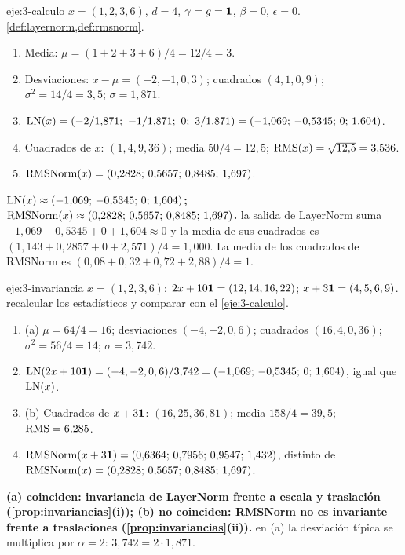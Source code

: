 \begin{solucion}{eje:3-calculo}
\datos $x=(1,2,3,6)$, $d=4$, $\gamma=g=\mathbf{1}$, $\beta=0$, $\epsilon=0$.
\planteamiento \cref{def:layernorm,def:rmsnorm}.
\pasos
\begin{enumerate}[label=\arabic*.]
  \item Media: $\mu=(1+2+3+6)/4=12/4=3$.
  \item Desviaciones: $x-\mu=(-2,-1,0,3)$; cuadrados $(4,1,0,9)$; $\sigma^{2}=14/4=3{,}5$; $\sigma=1{,}871$.
  \item $\LN(x)=(-2/1{,}871;\ -1/1{,}871;\ 0;\ 3/1{,}871)=(-1{,}069;\,-0{,}5345;\,0;\,1{,}604)$.
  \item Cuadrados de $x$: $(1,4,9,36)$; media $50/4=12{,}5$; $\operatorname{RMS}(x)=\sqrt{12{,}5}=3{,}536$.
  \item $\operatorname{RMSNorm}(x)=(0{,}2828;\,0{,}5657;\,0{,}8485;\,1{,}697)$.
\end{enumerate}
\resultado \textbf{$\operatorname{LN}(x)\approx(-1{,}069;\,-0{,}5345;\,0;\,1{,}604)$;}\newline \textbf{$\operatorname{RMSNorm}(x)\approx(0{,}2828;\,0{,}5657;\,0{,}8485;\,1{,}697)$.}
\comprobacion la salida de LayerNorm suma $-1{,}069-0{,}5345+0+1{,}604\approx 0$ y la media de sus cuadrados es $(1{,}143+0{,}2857+0+2{,}571)/4=1{,}000$. La media de los cuadrados de RMSNorm es $(0{,}08+0{,}32+0{,}72+2{,}88)/4=1$.
\end{solucion}

\begin{solucion}{eje:3-invariancia}
\datos $x=(1,2,3,6)$; $2x+10\mathbf{1}=(12,14,16,22)$; $x+3\mathbf{1}=(4,5,6,9)$.
\planteamiento recalcular los estadísticos y comparar con el \cref{eje:3-calculo}.
\pasos
\begin{enumerate}[label=\arabic*.]
  \item (a) $\mu=64/4=16$; desviaciones $(-4,-2,0,6)$; cuadrados $(16,4,0,36)$; $\sigma^{2}=56/4=14$; $\sigma=3{,}742$.
  \item $\operatorname{LN}(2x+10\mathbf{1})=(-4,-2,0,6)/3{,}742=(-1{,}069;\,-0{,}5345;\,0;\,1{,}604)$, igual que $\operatorname{LN}(x)$.
  \item (b) Cuadrados de $x+3\mathbf{1}$: $(16,25,36,81)$; media $158/4=39{,}5$; $\operatorname{RMS}=6{,}285$.
  \item $\operatorname{RMSNorm}(x+3\mathbf{1})=(0{,}6364;\,0{,}7956;\,0{,}9547;\,1{,}432)$, distinto de $\operatorname{RMSNorm}(x)=(0{,}2828;\,0{,}5657;\,0{,}8485;\,1{,}697)$.
\end{enumerate}
\resultado \textbf{(a) coinciden: invariancia de LayerNorm frente a escala y traslación (\cref{prop:invariancias}(i)); (b) no coinciden: RMSNorm no es invariante frente a traslaciones (\cref{prop:invariancias}(ii)).}
\comprobacion en (a) la desviación típica se multiplica por $\alpha=2$: $3{,}742=2\cdot 1{,}871$.
\end{solucion}

